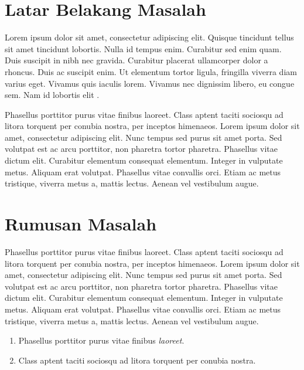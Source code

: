 
\section{Latar Belakang Masalah}

Lorem ipsum dolor sit amet, consectetur adipiscing elit. Quisque
tincidunt tellus sit amet tincidunt lobortis. Nulla id tempus
enim. Curabitur sed enim quam. Duis suscipit in nibh nec
gravida. Curabitur placerat ullamcorper dolor a rhoncus. Duis ac
suscipit enim. Ut elementum tortor ligula, fringilla viverra diam
varius eget. Vivamus quis iaculis lorem. Vivamus nec dignissim libero,
eu congue sem. Nam id lobortis elit \parencite{foster}.

Phasellus porttitor purus \textcite{warn} vitae finibus laoreet. Class
aptent taciti sociosqu ad litora torquent per conubia nostra, per
inceptos himenaeos. Lorem ipsum dolor sit amet, consectetur adipiscing
elit. Nunc tempus sed purus sit amet porta. Sed volutpat est ac arcu
porttitor, non pharetra tortor pharetra. Phasellus vitae dictum
elit. Curabitur elementum consequat elementum. Integer in vulputate
metus. Aliquam erat volutpat. Phasellus vitae convallis orci. Etiam ac
metus tristique, viverra metus a, mattis lectus. Aenean vel vestibulum
augue.

\section{Rumusan Masalah}

Phasellus porttitor purus vitae finibus laoreet. Class aptent taciti
sociosqu ad litora torquent per conubia nostra, per inceptos
himenaeos. Lorem ipsum dolor sit amet, consectetur adipiscing
elit. Nunc tempus sed purus sit amet porta. Sed volutpat est ac arcu
porttitor, non pharetra tortor pharetra. Phasellus vitae dictum
elit. Curabitur elementum consequat elementum. Integer in vulputate
metus. Aliquam erat volutpat. Phasellus vitae convallis orci. Etiam ac
metus tristique, viverra metus a, mattis lectus. Aenean vel vestibulum
augue.

\begin{enumerate}
\item  Phasellus porttitor purus vitae finibus \emph{laoreet}.
\item Class aptent taciti sociosqu ad litora torquent per conubia nostra.
\end{enumerate}


